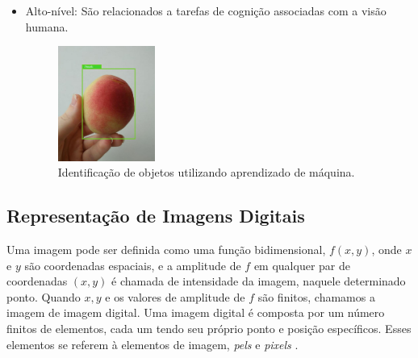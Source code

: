 \begin{itemize}
\item Alto-nível:
São relacionados a tarefas de cognição associadas com a visão humana.
       \begin{figure}[h]
	\caption{\label{fig:machineflow}Identificação de objetos utilizando aprendizado de máquina.}
	\begin{center}
	    \includegraphics[width=0.3\textwidth]{peachs/tensorflow}
	\end{center}
\end{figure}
	
\end{itemize} 




\subsection{Representação de Imagens Digitais}
Uma imagem pode ser definida como uma função bidimensional, $f(x,y)$, onde $x$ e $y$ são coordenadas espaciais, e a amplitude de $f$ em qualquer par de coordenadas $(x,y)$ é chamada de intensidade da imagem, naquele determinado ponto. Quando $x,y$ e os valores de amplitude de $f$ são finitos, chamamos a imagem de imagem digital. Uma imagem digital é composta por um número finitos de elementos, cada um tendo seu próprio ponto e posição específicos. Esses elementos se referem à elementos de imagem, \textit{pels} e \textit{pixels} \cite{gonzalez1992digital}. 

